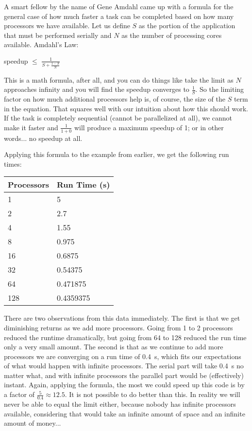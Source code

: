 A smart fellow by the name of Gene Amdahl came up with a formula for the general case of how much faster a task can be completed based on how many processors we have available. Let us define $S$ as the portion of the application that must be performed serially and $N$ as the number of processing cores available. Amdahl's Law:

\begin{center}
speedup $\leq$ {\huge $\frac{1}{S + \frac{1-S}{N}}$}
\end{center}

This is a math formula, after all, and you can do things like take the limit as $N$ approaches infinity and you will find the speedup converges to $\frac{1}{S}$. So the limiting factor on how much additional processors help is, of course, the size of the $S$ term in the equation. That squares well with our intuition about how this should work. If the task is completely sequential (cannot be parallelized at all), we cannot make it faster and $\frac{1}{1 + 0}$ will produce a maximum speedup of 1; or in other words... no speedup at all.

Applying this formula to the example from earlier, we get the following run times:

\begin{center}
	\begin{tabular}{l|l}
	\textbf{Processors} & \textbf{Run Time (s)} \\ \hline
	1 & 5\\
	2 & 2.7\\
	4 & 1.55\\
	8 & 0.975\\
	16 & 0.6875 \\
	32 & 0.54375 \\
	64 & 0.471875 \\
	128 & 0.4359375\\
	\end{tabular}
\end{center}

There are two observations from this data immediately. The first is that we get diminishing returns as we add more processors. Going from 1 to 2 processors reduced the runtime dramatically, but going from 64 to 128 reduced the run time only a very small amount. The second is that as we continue to add more processors we are converging on a run time of 0.4~s, which fits our expectations of what would happen with infinite processors. The serial part will take 0.4~s no matter what, and with infinite processors the parallel part would be (effectively) instant. Again, applying the formula, the most we could speed up this code is by a factor of $\frac{5}{0.4}\approx 12.5$. It is not possible to do better than this. In reality we will never be able to equal the limit either, because nobody has infinite processors available, considering that would take an infinite amount of space and an infinite amount of money...

